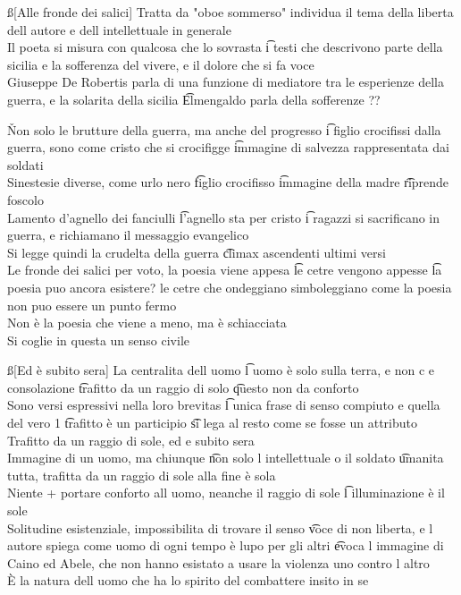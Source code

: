 \documentclass[12pt]{article}
\begin{document}
\ss[Alle fronde dei salici]
Tratta da "oboe sommerso" individua il tema della liberta dell autore e dell intellettuale in generale \\
Il poeta si misura con qualcosa che lo sovrasta \t i testi che descrivono parte della sicilia e la sofferenza del vivere, e il dolore che si fa voce \\
Giuseppe De Robertis parla di una funzione di mediatore tra le esperienze della guerra, e la solarita della sicilia \t Elmengaldo parla della sofferenze ??

\v

Non solo le brutture della guerra, ma anche del progresso \t i figlio crocifissi dalla guerra, sono come cristo che si crocifigge \t immagine di salvezza rappresentata dai soldati \\
Sinestesie diverse, come urlo nero \t figlio crocifisso \t immagine della madre \t riprende foscolo \\
Lamento d'agnello dei fanciulli \t l'agnello sta per cristo \t i ragazzi si sacrificano in guerra, e richiamano il messaggio evangelico \\
Si legge quindi la crudelta della guerra \t climax ascendenti ultimi versi \\
Le fronde dei salici per voto, la poesia viene appesa \t le cetre vengono appesse \t la poesia puo ancora esistere? le cetre che ondeggiano simboleggiano come la poesia non puo essere un punto fermo \\
Non è la poesia che viene a meno, ma è schiacciata \\
Si coglie in questa un senso civile

\ss[Ed è subito sera]
La centralita dell uomo \t l uomo è solo sulla terra, e non c e consolazione \t trafitto da un raggio di solo \t questo non da conforto \\
Sono versi espressivi nella loro brevitas \t l unica frase di senso compiuto e quella del vero 1 \t trafitto è un participio \t si lega al resto come se fosse un attributo \\
Trafitto da un raggio di sole, ed e subito sera \\
Immagine di un uomo, ma chiunque \t non solo l intellettuale o il soldato \t umanita tutta, trafitta da un raggio di sole alla fine è sola \\
Niente + portare conforto all uomo, neanche il raggio di sole \t l illuminazione è il sole \\
Solitudine esistenziale, impossibilita di trovare il senso \t voce di non liberta, e l autore spiega come uomo di ogni tempo è lupo per gli altri \t evoca l immagine di Caino ed Abele, che non hanno esistato a usare la violenza uno contro l altro \\
È la natura dell uomo che ha lo spirito del combattere insito in se
\end{document}
